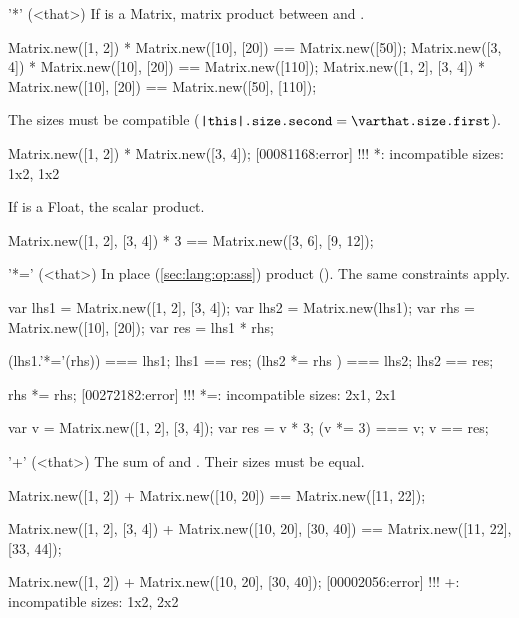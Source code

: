 \begin{urbiscriptapi}
\item['*'](<that>)%
  If \that is a Matrix, matrix product between \this and \that.
\begin{urbiassert}
Matrix.new([1, 2]) * Matrix.new([10], [20])
  == Matrix.new([50]);
Matrix.new([3, 4]) * Matrix.new([10], [20])
  == Matrix.new([110]);
Matrix.new([1, 2], [3, 4]) * Matrix.new([10], [20])
  == Matrix.new([50], [110]);
\end{urbiassert}

The sizes must be compatible ($\texttt{\this.size.second} =
\texttt{\that.size.first}$).
\begin{urbiscript}
Matrix.new([1, 2]) * Matrix.new([3, 4]);
[00081168:error] !!! *: incompatible sizes: 1x2, 1x2
\end{urbiscript}

  If \that is a Float, the scalar product.
\begin{urbiassert}
Matrix.new([1, 2], [3, 4]) * 3 == Matrix.new([3, 6], [9, 12]);
\end{urbiassert}


\item['*='](<that>)%
  In place (\autoref{sec:lang:op:ass}) product ().  The same
  constraints apply.
\begin{urbiassert}
var lhs1 = Matrix.new([1, 2], [3, 4]);
var lhs2 = Matrix.new(lhs1);
var rhs = Matrix.new([10], [20]);
var res = lhs1 * rhs;

(lhs1.'*='(rhs)) === lhs1;  lhs1 == res;
(lhs2  *=  rhs ) === lhs2;  lhs2 == res;

rhs *= rhs;
[00272182:error] !!! *=: incompatible sizes: 2x1, 2x1
\end{urbiassert}

\begin{urbiassert}
var v = Matrix.new([1, 2], [3, 4]);
var res = v * 3;
(v *= 3) === v; v == res;
\end{urbiassert}


\item['+'](<that>)%
  The sum of \this and \that.  Their sizes must be equal.
\begin{urbiassert}
Matrix.new([1, 2]) + Matrix.new([10, 20])
  == Matrix.new([11, 22]);

Matrix.new([1, 2], [3, 4]) + Matrix.new([10, 20], [30, 40])
  == Matrix.new([11, 22], [33, 44]);

Matrix.new([1, 2]) + Matrix.new([10, 20], [30, 40]);
[00002056:error] !!! +: incompatible sizes: 1x2, 2x2
\end{urbiassert}


\end{urbiscriptapi}
